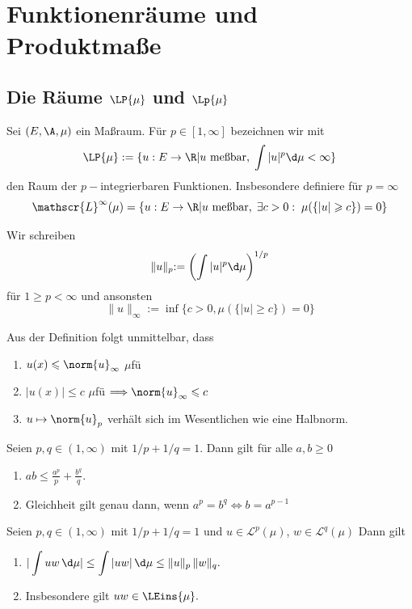 \documentclass[11pt, a4paper]{article}
\begin{document}
\newpage

\section{Funktionenräume und Produktmaße}
\subsection{Die Räume $\LP{\mu}$ und $\Lp{\mu}$}

\begin{definition}
    Sei $(E,\A,\mu)$ ein Maßraum. Für $p\in [1,\infty]$ bezeichnen wir mit 
    $$\LP{\mu}:= \{u:E\to \R | u \text{ meßbar},\; \int |u|^p \d\mu <\infty\} $$
    den Raum der $p-$integrierbaren Funktionen. Insbesondere definiere für $p=\infty$
    $$\mathscr{L}^\infty (\mu) = \{u:E\to \R | u \text{ meßbar},\; \exists c>0:\; \mu(\{|u|\geqslant c\}) = 0\} $$

    Wir schreiben $$\lVert u\lVert_p := \left(\int |u|^p \d\mu\right)^{1/p}$$ für $1\geqslant p < \infty$ und ansonsten
    $$\lVert u \lVert_\infty := \inf\{c>0, \mu(\{|u|\geqslant c\}) = 0\}$$
\end{definition}

\begin{corollary}
    Aus der Definition folgt unmittelbar, dass
    \begin{enumerate}
        \item $u(x)\leqslant \norm{u}_\infty$ $\mu$fü
        \item $|u(x)|\leqslant c$ $\mu$fü $\Longrightarrow \norm{u}_\infty \leqslant c$
        \item $u\mapsto \norm{u}_p$ verhält sich im Wesentlichen wie eine Halbnorm.
    \end{enumerate}
\end{corollary}

\begin{lemma}
Seien $p,q\in (1,\infty)$ mit $1/p+1/q=1.$ Dann gilt für alle $a,b\geq 0$
\begin{enumerate}[label=\alph*)]
    \item $ab \leq \frac{a^p}{p}+\frac{b^q}{q}.$
    \item Gleichheit gilt genau dann, wenn
    $a^p=b^q \Longleftrightarrow b = a^{p-1}$
\end{enumerate}
\end{lemma}


\begin{theorem}
Seien $p,q\in (1,\infty)$ mit $1/p+1/q=1$ und
$u\in \mathscr{L}^p(\mu)$, $w\in \mathscr{L}^q(\mu)$
Dann gilt
\begin{enumerate}[label=\alph*)]
    \item $\displaystyle |\int uw\,\d\mu| \leq \int |uw|\,\d\mu \leq \lVert u\rVert_p\, \lVert w\rVert_q.$
    \item Insbesondere gilt $uw\in \LEins{\mu}.$
\end{enumerate}
\end{theorem}
\end{document}
